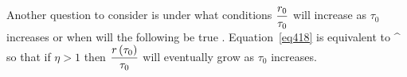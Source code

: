 Another question to consider is under what conditions $\displaystyle\frac{r_{0}}{\tau_{0}}$ will increase as $\tau_{0}$ increases or when will the
following be true
\be\label{eq418}
  \ge {} .
\ee
Equation~\ref{eq418} is equivalent to 
\be
 \alpha{}^{} 
\ee
so that if $\eta >1$ then $\displaystyle\frac{{r}\left ( {\tau_{0}} \right )}{\tau_{0}}$ will eventually grow as $\tau_{0}$ increases.
